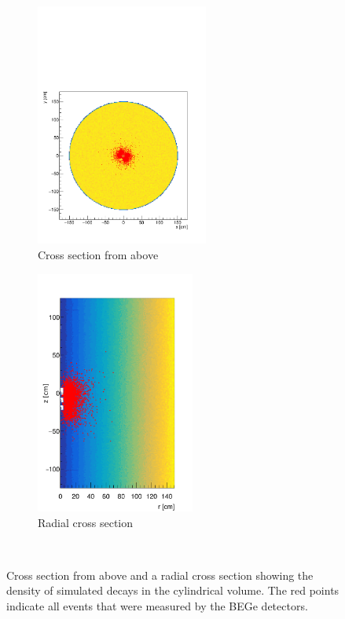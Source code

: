\begin{figure}[t!]
	\centering
	\begin{subfigure}{.5\textwidth}
		\centering
		\includegraphics[height=80mm]{./Bilder/MC-Querschnitt-BEGes.pdf}
		\caption{Cross section from above}
		\label{fig:CrossSecAb}
	\end{subfigure}%
	\begin{subfigure}{.5\textwidth}
		\centering
		\includegraphics[height=80mm]{./Bilder/MC-Radius-BEGes.png}
		\caption{Radial cross section}
		\label{fig:CrossSecRa}
	\end{subfigure}
    \\
	\vspace{0.5cm}
    \caption{Cross section from above and a radial cross section showing the density of simulated decays in the cylindrical volume. The red points indicate all events that were measured by the BEGe detectors.}
\vspace{0.5cm}
\end{figure}
\\

